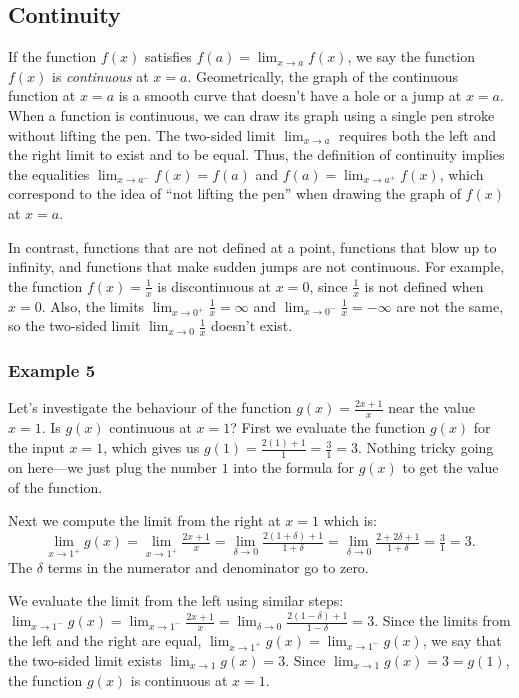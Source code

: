 	\subsection{Continuity}
	\label{limits:continuity}

		If the function $f(x)$ satisfies $f(a) = \lim_{x\to a} f(x)$,
		we say the function $f(x)$ is \emph{continuous} at $x=a$.
		Geometrically,
		the graph of the continuous function at $x=a$ is a smooth curve
		that doesn't have a hole or a jump at $x=a$.
		When a function is continuous,
		we can draw its graph using a single pen stroke
		without lifting the pen.
		The two-sided limit $\lim_{x\to a}$ requires both the left and the right limit to exist and to be equal.
		Thus,
		the definition of continuity implies the equalities $\lim_{x \to a^-}  f(x) =  f(a)$
		and $f(a) = \lim_{x \to a^+}  f(x)$,
		which correspond to the idea of ``not lifting the pen'' when drawing the graph of $f(x)$ at $x=a$.

		In contrast,
		functions that are not defined at a point,
		functions that blow up to infinity,
		and functions that make sudden jumps are not continuous.
		For example,
		the function $f(x) = \frac{1}{x}$
		is discontinuous at $x=0$,
		since $\frac{1}{x}$ is not defined when $x=0$.
		Also,
		the limits $\lim_{x \to 0^+} \frac{1}{x} = \infty$ and $\lim_{x \to 0^-} \frac{1}{x} = -\infty$
		are not the same,
		so the two-sided limit $\lim_{x \to 0} \frac{1}{x}$ doesn't exist.


		\subsubsection{Example 5}
			
			Let's investigate the behaviour of the function $g(x)=\frac{2x+1}{x}$ near the value $x=1$.
			Is $g(x)$ continuous at $x=1$?
			First we evaluate the function $g(x)$ for the input $x=1$,
			which gives us $g(1) = \frac{2(1)+1}{1} = \frac{3}{1}=3$.
			Nothing tricky going on here---we just plug the number $1$ into the formula for $g(x)$ to get the value of the function.

			Next we compute the limit from the right at $x=1$
			which is:
			\[
				\lim_{x\to 1^+}\! g(x)
					= \!\!\lim_{x\to 1^+}\!\! \tfrac{2x+1}{x}
					= \lim_{\delta \to 0}\! \tfrac{2(1+\delta)+1}{1+\delta}
					= \lim_{\delta \to 0}\! \tfrac{2+2\delta+1}{1+\delta}
					= \tfrac{3}{1}
					= 3.
			\]
			The $\delta$ terms in the numerator and denominator go to zero.

			We evaluate the limit from the left using similar steps:
			$\lim_{x\to 1^-} g(x) = \lim_{x\to 1^-} \frac{2x+1}{x} = \lim_{\delta \to 0} \tfrac{2(1-\delta)+1}{1-\delta} = 3$.
			Since the limits from the left and the right are equal,
			$\lim_{x\to 1^+} g(x) = \lim_{x\to 1^-} g(x)$,
			we say that the two-sided limit exists $\lim_{x\to 1} g(x) = 3$.
			Since $\lim_{x\to 1} g(x) = 3 = g(1)$,
			the function $g(x)$ is continuous at $x=1$.

